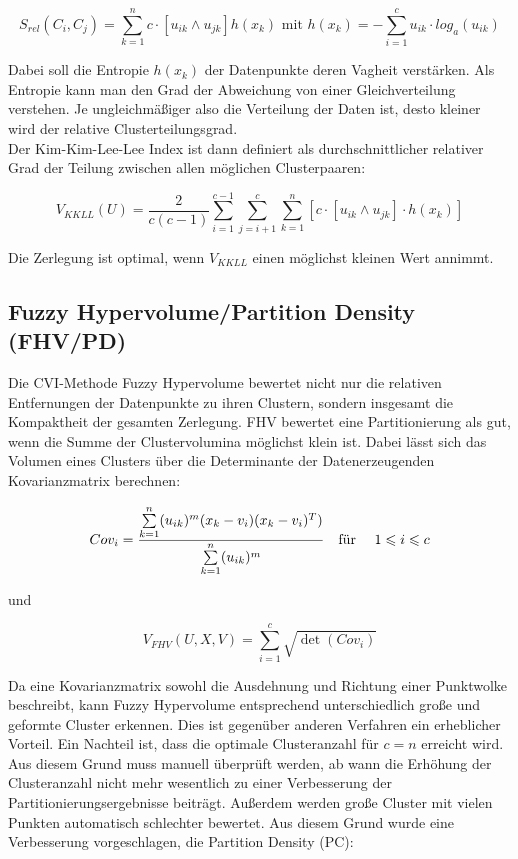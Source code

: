 \documentclass[11pt,ceqn]{book}
\begin{document}
$$S_{rel}(C_i,C_j) = \sum_{k=1}^n c\cdot \left[u_{ik} \land u_{jk}\right] h(x_k) \text{ mit } h(x_k) = -\sum_{i=1}^c u_{ik}\cdot log_a(u_{ik})$$

Dabei soll die Entropie $h(x_k)$ der Datenpunkte deren Vagheit verstärken. Als Entropie kann man den Grad der Abweichung von einer Gleichverteilung verstehen. Je ungleichmäßiger also die Verteilung der Daten ist, desto kleiner wird der relative Clusterteilungsgrad.
\\
Der Kim-Kim-Lee-Lee Index ist dann definiert als durchschnittlicher
relativer Grad der Teilung zwischen allen möglichen Clusterpaaren:

$$V_{KKLL}(U) = \frac{2}{c(c-1)} \sum_{i=1}^{c-1} \sum_{j=i+1}^c \sum_{k=1}^n \left[c \cdot \left[u_{ik} \land u_{jk} \right]\cdot h(x_k)\right]$$

Die Zerlegung ist optimal, wenn $V_{KKLL}$ einen möglichst kleinen Wert annimmt.

\subsection{Fuzzy Hypervolume/Partition Density (FHV/PD)}
Die CVI-Methode Fuzzy Hypervolume \cite{fhv} bewertet nicht nur die relativen Entfernungen der Datenpunkte zu ihren Clustern, sondern insgesamt die Kompaktheit der gesamten Zerlegung. FHV bewertet eine Partitionierung als gut, wenn die Summe der Clustervolumina möglichst klein ist. Dabei lässt sich das Volumen eines Clusters über die Determinante der Datenerzeugenden Kovarianzmatrix berechnen: 

$$Cov_i = \frac{\sum\limits_{k=1}^n (u_{ik})^m (x_k-v_i)(x_k-v_i)^T)}{\sum\limits_{k=1}^n (u_{ik})^m} \text{\quad für \quad} 1\leqslant i\leqslant c$$

und

$$V_{FHV}(U,X,V) = \sum_{i=1}^c \sqrt{\det(Cov_i)}$$

Da eine Kovarianzmatrix sowohl die Ausdehnung und Richtung einer Punktwolke beschreibt, kann Fuzzy Hypervolume entsprechend unterschiedlich große und geformte Cluster erkennen. Dies ist gegenüber anderen Verfahren ein erheblicher Vorteil. Ein Nachteil ist, dass die optimale Clusteranzahl für $c=n$ erreicht wird. Aus diesem Grund muss manuell überprüft werden, ab wann die Erhöhung der Clusteranzahl nicht mehr wesentlich zu einer Verbesserung der Partitionierungsergebnisse beiträgt. Außerdem werden große Cluster mit vielen Punkten automatisch schlechter bewertet. Aus diesem Grund wurde eine Verbesserung vorgeschlagen, die Partition Density (PC):
\end{document}
